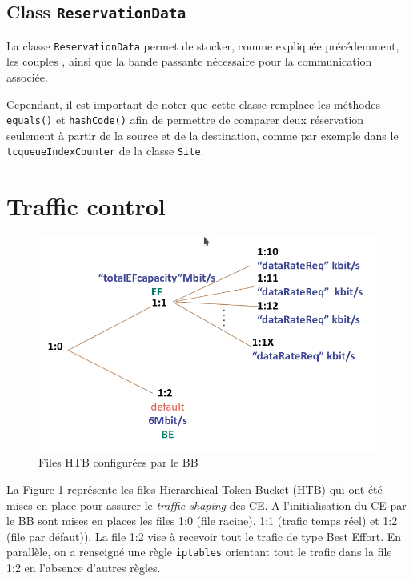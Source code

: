 \documentclass[a4paper,11pt]{article}
\let\Oldsection\section
\renewcommand{\section}{\FloatBarrier\Oldsection}
\let\Oldsubsection\subsection
\renewcommand{\subsection}{\FloatBarrier\Oldsubsection}
\begin{document}
\subsection{Class \texttt{ReservationData}}

La classe \texttt{ReservationData} permet de stocker, comme expliquée précédemment, les couples , ainsi que la bande passante nécessaire pour la communication associée.

Cependant, il est important de noter que cette classe remplace les méthodes \texttt{equals()} et \texttt{hashCode()} afin de permettre de comparer deux réservation seulement à partir de la source et de la destination, comme par exemple dans le \texttt{tcqueueIndexCounter} de la classe \texttt{Site}.


\section{Traffic control}

\begin{figure}[htp]
    \centering
    \includegraphics[width=\textwidth]{images/tc.png}
    \caption{Files HTB configurées par le BB}
    \label{fig:htb-files}
\end{figure}

La Figure \ref{fig:htb-files} représente les files Hierarchical Token Bucket (HTB) qui ont été mises en place pour assurer le \emph{traffic shaping} des CE. 
A l’initialisation du CE par le BB sont mises en places les files 1:0 (file racine), 1:1 (trafic temps réel) et 1:2 (file par défaut)). La file 1:2 vise à recevoir tout le trafic de type Best Effort. En parallèle, on a renseigné une règle \texttt{iptables} orientant tout le trafic dans la file 1:2 en l'absence d'autres règles.
\end{document}
